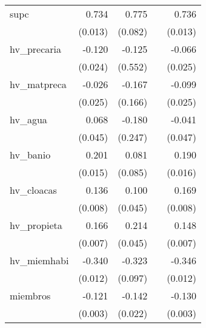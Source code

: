 {\begin{longtable}{l*{4}{D{.}{.}{-1}}}
\addlinespace
supc        &       0.734\sym{***}&       0.775\sym{***}&                     &       0.736\sym{***}\\
            &     (0.013)         &     (0.082)         &                     &     (0.013)         \\
\addlinespace
hv\_precaria &      -0.120\sym{***}&      -0.125         &                     &      -0.066\sym{**} \\
            &     (0.024)         &     (0.552)         &                     &     (0.025)         \\
\addlinespace
hv\_matpreca &      -0.026         &      -0.167         &                     &      -0.099\sym{***}\\
            &     (0.025)         &     (0.166)         &                     &     (0.025)         \\
\addlinespace
hv\_agua     &       0.068         &      -0.180         &                     &      -0.041         \\
            &     (0.045)         &     (0.247)         &                     &     (0.047)         \\
\addlinespace
hv\_banio    &       0.201\sym{***}&       0.081         &                     &       0.190\sym{***}\\
            &     (0.015)         &     (0.085)         &                     &     (0.016)         \\
\addlinespace
hv\_cloacas  &       0.136\sym{***}&       0.100\sym{*}  &                     &       0.169\sym{***}\\
            &     (0.008)         &     (0.045)         &                     &     (0.008)         \\
\addlinespace
hv\_propieta &       0.166\sym{***}&       0.214\sym{***}&                     &       0.148\sym{***}\\
            &     (0.007)         &     (0.045)         &                     &     (0.007)         \\
\addlinespace
hv\_miemhabi &      -0.340\sym{***}&      -0.323\sym{***}&                     &      -0.346\sym{***}\\
            &     (0.012)         &     (0.097)         &                     &     (0.012)         \\
\addlinespace
miembros    &      -0.121\sym{***}&      -0.142\sym{***}&                     &      -0.130\sym{***}\\
            &     (0.003)         &     (0.022)         &                     &     (0.003)         \\

\end{longtable}}
